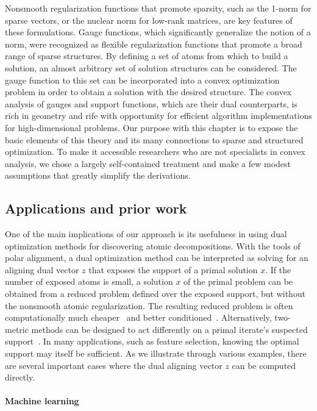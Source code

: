 Nonsmooth regularization functions that promote sparsity, such as the 1-norm for
sparse vectors, or the nuclear norm for low-rank matrices, are key features of
these formulations. Gauge functions, which significantly generalize the notion
of a norm, were recognized as flexible regularization functions that promote a
broad range of sparse structures. By defining a set of atoms from which to build
a solution, an almost arbitrary set of solution structures can be considered.
The gauge function to this set can be incorporated into a convex optimization
problem in order to obtain a solution with the desired structure. The convex
analysis of gauges and support functions, which are their dual counterparts, is
rich in geometry and rife with opportunity for efficient algorithm
implementations for high-dimensional problems. Our purpose with this chapter
is to expose the basic elements of this theory and its many connections to
sparse and structured optimization. To make it accessible researchers who are
not specialists in convex analysis, we chose a largely self-contained treatment
and make a few modest assumptions that greatly simplify the derivations.

\subsection{Applications and prior work}

One of the main implications of our approach is its usefulness in using dual
optimization methods for discovering atomic decompositions. With the tools of
polar alignment, a dual optimization method can be interpreted as solving for an
aligning dual vector $z$ that exposes the support of a primal solution $x$. If
the number of exposed atoms is small, a solution $x$ of the primal problem can
be obtained from a reduced problem defined over the exposed support, but without
the nonsmooth atomic regularization. The resulting reduced problem is often
computationally much cheaper~\citep{freund2017extended} and better
conditioned~\citep{negahban2012restricted}. Alternatively, two-metric methods can
be designed to act differently on a primal iterate's suspected
support~\citep{gafni1984two}. In many applications, such as feature selection,
knowing the optimal support may itself be sufficient.  As we illustrate through
various examples, there are several important cases where the dual aligning
vector $z$ can be computed directly.

\paragraph{Machine learning}

